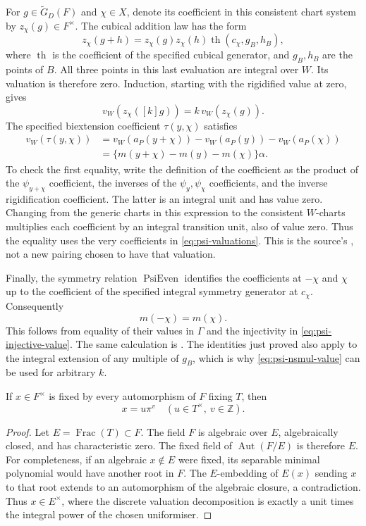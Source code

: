 For \(g\in\widetilde G_D(F)\) and \(\chi\in X\), denote its coefficient
in this consistent chart system by \(z_\chi(g)\in F^\times\).
The cubical addition law has the form
\[
 z_\chi(g+h)
  =z_\chi(g)z_\chi(h)
     \operatorname{th}(c_\chi,g_B,h_B),
\]
where \(\operatorname{th}\) is the coefficient of the specified
cubical generator, and \(g_B,h_B\) are the points of \(B\).
All three points in this last evaluation are integral over \(W\).
Its valuation is therefore zero.  Induction, starting with the
rigidified value at zero, gives
\[
                  v_W(z_\chi([k]g))
                     =k\,v_W(z_\chi(g)).
 \tag{PU4}\label{eq:psi-nsmul-value}
\]
The specified biextension coefficient \(\tau(y,\chi)\) satisfies
\[
 \begin{split}
 v_W(\tau(y,\chi))
   &=v_W(a_P(y+\chi))-v_W(a_P(y))-v_W(a_P(\chi))\\
   &=\{m(y+\chi)-m(y)-m(\chi)\}\alpha .
 \end{split}
 \tag{PU5}\label{eq:psi-tau-value}
\]
To check the first equality, write the definition of the coefficient
as the product of the \(\psi_{y+\chi}\) coefficient, the inverses of the
\(\psi_y,\psi_\chi\) coefficients, and the inverse rigidification
coefficient.  The latter is an integral unit and has value zero.
Changing from the generic charts in this expression to the consistent
\(W\)-charts multiplies each coefficient by an integral transition
unit, also of value zero.  Thus the equality uses the very
coefficients in \eqref{eq:psi-valuations}.  This is the source's
, not a new pairing chosen to have that valuation.

Finally, the symmetry relation \(\operatorname{PsiEven}\) identifies
the coefficients at \(-\chi\) and \(\chi\) up to the coefficient of the
specified integral symmetry generator at \(c_\chi\).
Consequently
\[
                         m(-\chi)=m(\chi).
 \tag{PU6}\label{eq:psi-even-value}
\]
This follows from equality of their values in \(\Gamma\) and the
injectivity in \eqref{eq:psi-injective-value}.  The same calculation is
.  The identities just proved also apply to the integral
extension of any multiple of \(g_B\), which is why
\eqref{eq:psi-nsmul-value} can be used for arbitrary \(k\).

\begin{srlemma}
\label{lem:psi-fixed-field}
If \(x\in F^\times\) is fixed by every automorphism of \(F\) fixing
\(T\), then
\[
                          x=u\pi^v
                  \quad (u\in T^\times,\ v\in\mathbb Z).
\]
\end{srlemma}
\begin{proof}
Let \(E=\operatorname{Frac}(T)\subset F\).
The field \(F\) is algebraic over \(E\), algebraically closed, and has
characteristic zero.  The fixed field of
\(\operatorname{Aut}(F/E)\) is therefore \(E\).
For completeness, if an algebraic \(x\notin E\) were fixed, its
separable minimal polynomial would have another root in \(F\).
The \(E\)-embedding of \(E(x)\) sending \(x\) to that root extends to an
automorphism of the algebraic closure, a contradiction.
Thus \(x\in E^\times\), where the discrete valuation decomposition is
exactly a unit times the integral power of the chosen uniformiser.
\end{proof}

